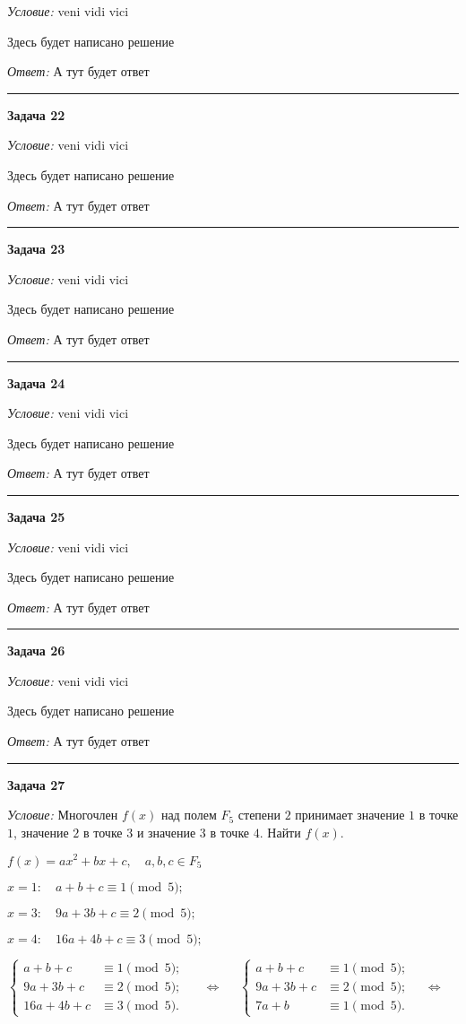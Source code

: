 \documentclass[12pt,a4paper]{article}
\newcommand{\sbs}{\large \bfseries}
\newcommand{\rl}{\vspace{16pt} \hrule \vspace{8pt}}
\begin{document}
{\itshape Условие: } veni vidi vici

Здесь будет написано решение

{\itshape Ответ: } А тут будет ответ




\rl
{\sbs Задача 22}

{\itshape Условие: } veni vidi vici

Здесь будет написано решение

{\itshape Ответ: } А тут будет ответ




\rl
{\sbs Задача 23}

{\itshape Условие: } veni vidi vici

Здесь будет написано решение

{\itshape Ответ: } А тут будет ответ




\rl
{\sbs Задача 24}

{\itshape Условие: } veni vidi vici

Здесь будет написано решение

{\itshape Ответ: } А тут будет ответ




\rl
{\sbs Задача 25}

{\itshape Условие: } veni vidi vici

Здесь будет написано решение

{\itshape Ответ: } А тут будет ответ




\rl
{\sbs Задача 26}

{\itshape Условие: } veni vidi vici

Здесь будет написано решение

{\itshape Ответ: } А тут будет ответ




\rl
{\sbs Задача 27}

{\itshape Условие: } Многочлен $f(x)$ над полем  $F_5$ степени  $2$ принимает значение $1$ в точке $1$, значение $2$ в точке $3$ и значение $3$ в точке $4$. Найти $f(x)$.

$f(x)=ax^2+bx+c, \quad a, b ,c \in F_5$

$x=1 \colon \quad a+b+c  \equiv 1\pmod{5};$

$x=3 \colon \quad 9a+3b+c  \equiv 2\pmod{5};$

$x=4 \colon \quad 16a+4b+c \equiv 3\pmod{5};$


$\left\{
\begin{aligned}
a+b+c & \equiv 1\pmod{5}; \\
9a+3b+c & \equiv 2\pmod{5}; \\
16a+4b+c & \equiv 3\pmod{5}.
\end{aligned}
\right.$
$\quad \Leftrightarrow \quad $
$\left\{
\begin{aligned}
a+b+c & \equiv 1\pmod{5}; \\
9a+3b+c & \equiv 2\pmod{5}; \\
7a+b & \equiv 1\pmod{5}.
\end{aligned}
\right.
\quad \Leftrightarrow \quad $
\end{document}
